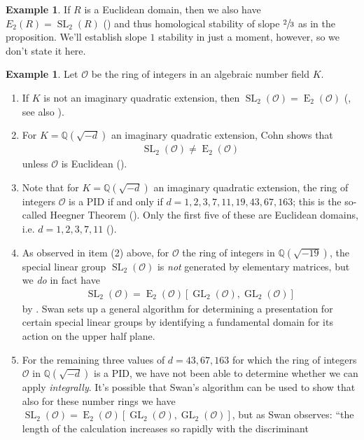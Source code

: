 \documentclass[12pt, reqno]{amsart}
\theoremstyle{plain}
\theoremstyle{definition}
\newtheorem{example}[theorem]{Example}
\newcommand{\Q}{\mathbb Q}
\begin{document}
\begin{example}\label{2/3 euclidean}
If $R$ is a Euclidean domain, then we also have $E_2(R)=\operatorname{SL}_2(R)$ (\cite[Exercise 1.5, Chapter III]{Weibel99}) and thus homological stability of slope $\sfrac{2}{3}$ as in the proposition. We'll establish slope $1$ stability in just a moment, however, so we don't state it here.
\end{example}

\begin{example}\label{rings of integers and E2}
Let $\mathcal{O}$ be the ring of integers in an algebraic number field $K$.
\begin{enumerate}
\item If $K$ is not an imaginary quadratic extension, then $\operatorname{SL}_2(\mathcal{O})=\operatorname{E}_2(\mathcal{O})$ (\cite{Vaserstein}, see also \cite{Nica}).
\item For $K=\Q(\sqrt{-d})$ an imaginary quadratic extension, Cohn shows that
\begin{align*}
\operatorname{SL}_2(\mathcal{O})\neq\operatorname{E}_2(\mathcal{O})
\end{align*}
unless $\mathcal{O}$ is Euclidean (\cite{Cohn66}).
\item Note that for $K=\Q(\sqrt{-d})$ an imaginary quadratic extension, the ring of integers $\mathcal{O}$ is a PID if and only if $d=1,2,3,7,11,19,43,67,163$; this is the so-called Heegner Theorem (\cite{Stark}). Only the first five of these are Euclidean domains, i.e. $d=1,2,3,7,11$ (\cite{Motzkin}).
\item As observed in item (2) above, for $\mathcal{O}$ the ring of integers in $\Q(\sqrt{-19})$, the special linear group $\operatorname{SL}_2(\mathcal{O})$ is \textit{not} generated by elementary matrices, but we \textit{do} in fact have
\begin{align*}
\operatorname{SL}_2(\mathcal{O})=\operatorname{E}_2(\mathcal{O})[\operatorname{GL}_2(\mathcal{O}),\operatorname{GL}_2(\mathcal{O})]
\end{align*}
by \cite[\S 16]{Swan71}. Swan sets up a general algorithm for determining a presentation for certain special linear groups by identifying a fundamental domain for its action on the upper half plane.
\item For the remaining three values of $d=43,67,163$ for which the ring of integers $\mathcal{O}$ in $\Q(\sqrt{-d})$ is a PID, we have not been able to determine whether we can apply  \textit{integrally}. It's possible that Swan's algorithm can be used to show that also for these number rings we have $\operatorname{SL}_2(\mathcal{O})=\operatorname{E}_2(\mathcal{O})[\operatorname{GL}_2(\mathcal{O}),\operatorname{GL}_2(\mathcal{O})]$, but as Swan observes: ``the length of the calculation increases so rapidly with the discriminant

\end{enumerate}
\end{example}
\end{document}

